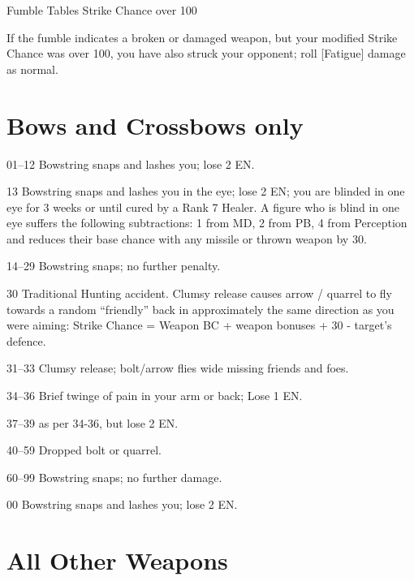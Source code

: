 \begin{Chapter}{Fumble Tables}
Strike Chance over 100 

If the fumble indicates a broken or damaged weapon, but your modified
Strike Chance was over 100, you have also struck your opponent; roll
[Fatigue] damage as normal.

\section{Bows and Crossbows only}

\begin{Description}

\item[01–12] Bowstring snaps and lashes you; lose 2 EN.

\item[13] Bowstring snaps and lashes you in the eye; lose 2 EN; you
  are blinded in one eye for 3 weeks or until cured by a Rank 7
  Healer. A figure who is blind in one eye suffers the following
  subtractions: 1 from MD, 2 from PB, 4 from Perception and reduces
  their base chance with any missile or thrown weapon by 30.

\item[14–29] Bowstring snaps; no further penalty.

\item[30] Traditional Hunting accident. Clumsy release causes arrow /
  quarrel to fly towards a random “friendly” back in approximately the
  same direction as you were aiming: Strike Chance = Weapon BC +
  weapon bonuses + 30 - target’s defence.

\item[31–33]  Clumsy release; bolt/arrow flies wide missing friends and foes. 

\item[34–36] Brief twinge of pain in your arm or back; Lose 1 EN.

\item[37–39] as per 34-36, but lose 2 EN.

\item[40–59] Dropped bolt or quarrel.

\item[60–99] Bowstring snaps; no further damage.

\item[00] Bowstring snaps and lashes you; lose 2 EN.

\end{Description}

\section{All Other Weapons}


\end{Chapter}
